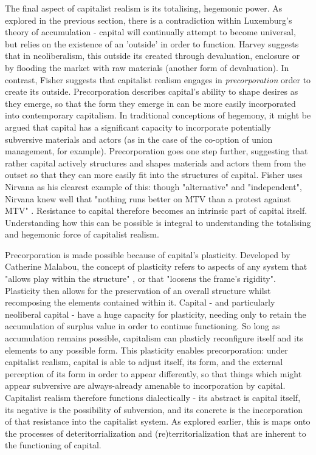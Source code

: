 The final aspect of capitalist realism is its totalising, hegemonic power. As explored in the previous section,  there is a contradiction within Luxemburg's theory of accumulation - capital will continually attempt to become universal, but relies on the existence of an 'outside' in order to function. Harvey suggests that in neoliberalism, this outside its created through devaluation, enclosure or by flooding the market with raw materials (another form of devaluation). In contrast, Fisher suggests that capitalist realism engages in \emph{precorporation} order to create its outside. Precorporation describes capital's ability to shape desires as they emerge, so that the form they emerge in can be more easily incorporated into contemporary capitalism. In traditional conceptions of hegemony, it might be argued that capital has a significant capacity to incorporate potentially subversive materials and actors (as in the case of the co-option of union management, for example). Precorporation goes one step further, suggesting that rather capital actively structures and shapes materials and actors them from the outset so that they can more easily fit into the structures of capital. Fisher uses Nirvana as his clearest example of this: though "alternative" and "independent", Nirvana knew well that "nothing runs better on MTV than a protest against MTV" \citep[13]{fisher_capitalist_2009}. Resistance to capital therefore becomes an intrinsic part of capital itself. Understanding how this can be possible is integral to understanding the totalising and hegemonic force of capitalist realism.

Precorporation is made possible because of capital's plasticity. Developed by Catherine Malabou, the concept of plasticity refers to aspects of any system that "allows play within the structure" \citep[44]{malabou_sovereignty_2015}, or that "loosens the frame's rigidity". Plasticity then allows for the preservation of an overall structure whilst recomposing the elements contained within it. Capital - and particularly neoliberal capital - have a huge capacity for plasticity, needing only to retain the accumulation of surplus value in order to continue functioning. So long as accumulation remains possible, capitalism can plasticly reconfigure itself and its elements to any possible form. This plasticity enables precorporation:  under capitalist realism, capital is able to adjust itself, its form, and the external perception of its form in order to appear differently, so that things which might appear subversive are always-already amenable to incorporation by capital. Capitalist realism therefore functions dialectically - its abstract is capital itself, its negative is the possibility of subversion, and its concrete is the incorporation of that resistance into the capitalist system. As explored earlier, this is maps onto the processes of deteritorrialization and (re)territorialization that are inherent to the functioning of capital.

